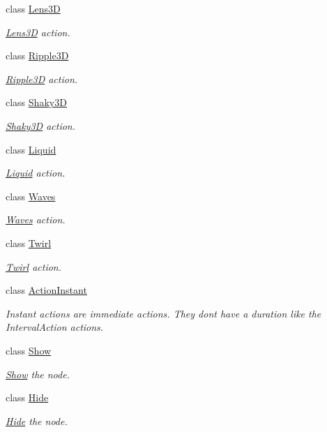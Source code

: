 \begin{DoxyCompactItemize}
class \hyperlink{classLens3D}{Lens3D}
\begin{DoxyCompactList}\small\item\em \hyperlink{classLens3D}{Lens3D} action. \end{DoxyCompactList}\item 
class \hyperlink{classRipple3D}{Ripple3D}
\begin{DoxyCompactList}\small\item\em \hyperlink{classRipple3D}{Ripple3D} action. \end{DoxyCompactList}\item 
class \hyperlink{classShaky3D}{Shaky3D}
\begin{DoxyCompactList}\small\item\em \hyperlink{classShaky3D}{Shaky3D} action. \end{DoxyCompactList}\item 
class \hyperlink{classLiquid}{Liquid}
\begin{DoxyCompactList}\small\item\em \hyperlink{classLiquid}{Liquid} action. \end{DoxyCompactList}\item 
class \hyperlink{classWaves}{Waves}
\begin{DoxyCompactList}\small\item\em \hyperlink{classWaves}{Waves} action. \end{DoxyCompactList}\item 
class \hyperlink{classTwirl}{Twirl}
\begin{DoxyCompactList}\small\item\em \hyperlink{classTwirl}{Twirl} action. \end{DoxyCompactList}\item 
class \hyperlink{classActionInstant}{Action\+Instant}
\begin{DoxyCompactList}\small\item\em Instant actions are immediate actions. They don\textquotesingle{}t have a duration like the Interval\+Action actions. \end{DoxyCompactList}\item 
class \hyperlink{classShow}{Show}
\begin{DoxyCompactList}\small\item\em \hyperlink{classShow}{Show} the node. \end{DoxyCompactList}\item 
class \hyperlink{classHide}{Hide}
\begin{DoxyCompactList}\small\item\em \hyperlink{classHide}{Hide} the node. \end{DoxyCompactList}\item 

\end{DoxyCompactItemize}
